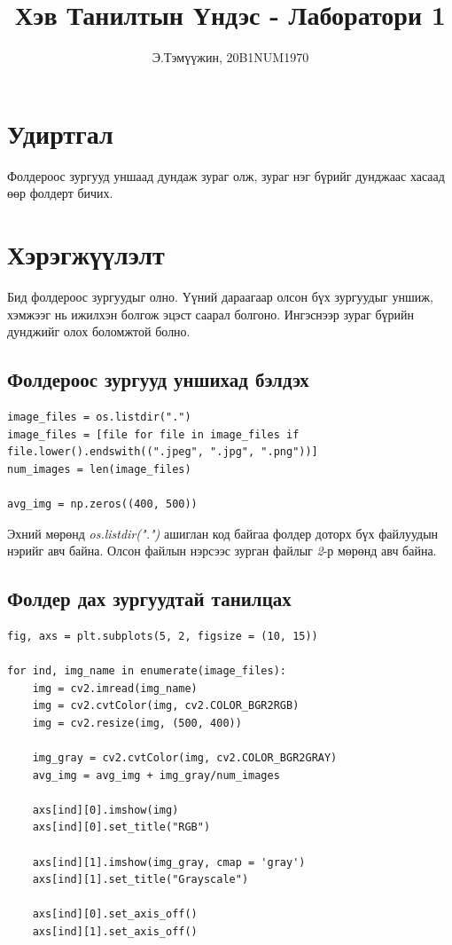 \documentclass[a4paper]{article}
\title{Хэв Танилтын Үндэс - Лаборатори 1}
\author{Э.Тэмүүжин,  20B1NUM1970}
\begin{document}
\maketitle

\section{Удиртгал}
Фолдероос зургууд уншаад дундаж зураг олж,  зураг нэг бүрийг дунджаас хасаад өөр фолдерт бичих.
\section{Хэрэгжүүлэлт}
Бид фолдероос зургуудыг олно. Үүний дараагаар олсон бүх зургуудыг уншиж, хэмжээг нь ижилхэн болгож эцэст саарал болгоно. Ингэснээр зураг бүрийн дунджийг олох боломжтой болно.

\subsection{Фолдероос зургууд уншихад бэлдэх}
\begin{lstlisting}
image_files = os.listdir(".")
image_files = [file for file in image_files if file.lower().endswith((".jpeg", ".jpg", ".png"))]
num_images = len(image_files)

avg_img = np.zeros((400, 500))
\end{lstlisting}

Эхний мөрөнд \textit{os.listdir(".")} ашиглан код байгаа фолдер доторх бүх файлуудын нэрийг авч байна.  Олсон файлын нэрсээс зурган файлыг \textit{2}-р мөрөнд авч байна. 

\subsection{Фолдер дах зургуудтай танилцах}
\begin{lstlisting}
fig, axs = plt.subplots(5, 2, figsize = (10, 15))

for ind, img_name in enumerate(image_files):
    img = cv2.imread(img_name)
    img = cv2.cvtColor(img, cv2.COLOR_BGR2RGB)
    img = cv2.resize(img, (500, 400))
    
    img_gray = cv2.cvtColor(img, cv2.COLOR_BGR2GRAY)
    avg_img = avg_img + img_gray/num_images

    axs[ind][0].imshow(img)
    axs[ind][0].set_title("RGB")

    axs[ind][1].imshow(img_gray, cmap = 'gray')
    axs[ind][1].set_title("Grayscale")

    axs[ind][0].set_axis_off()
    axs[ind][1].set_axis_off()
\end{lstlisting}
\end{document}
